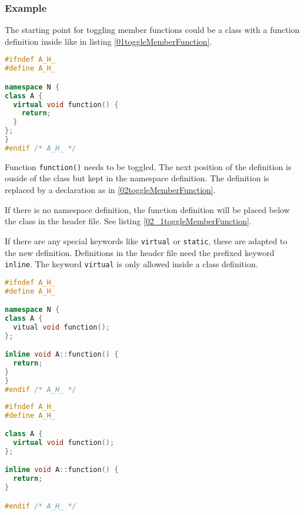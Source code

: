 \subsubsection{Example}

The starting point for toggling member functions could be a class with a
function definition inside like in listing
\nolinebreak\ref{01toggleMemberFunction}.

\begin{lstlisting}[caption={A.h, function definition inside class declaration},
label={01toggleMemberFunction}, language=C++]
#ifndef A_H_
#define A_H_

namespace N {
class A {
  virtual void function() {
    return;
  }
};
}
#endif /* A_H_ */
\end{lstlisting}

Function \texttt{function()} needs to be toggled. The next position of the
definition is ouside of the class but kept in the namespace definition.
The definition is replaced by a declaration as in \ref{02toggleMemberFunction}.

If there is no namespace definition, the function definition will be placed
below the class in the header file. See listing \ref{02_1toggleMemberFunction}.

If there are any special keywords like \texttt{virtual} or \texttt{static},
these are adapted to the new definition. Definitions in the header file need
the prefixed keyword \texttt{inline}. The keyword \texttt{virtual}
is only allowed inside a class definition.

\begin{lstlisting}[caption={A.h, function definition outside of class definition
in
header}, label={02toggleMemberFunction}, language=C++]
#ifndef A_H_
#define A_H_

namespace N {
class A {
  vitual void function();
};

inline void A::function() {
  return;
}
}
#endif /* A_H_ */
\end{lstlisting}

\begin{lstlisting}[caption={A.h,
function definition outside class definition without namespace},
label={02_1toggleMemberFunction}, language=C++]
#ifndef A_H_
#define A_H_

class A {
  virtual void function();
};

inline void A::function() {
  return;
}

#endif /* A_H_ */
\end{lstlisting}

